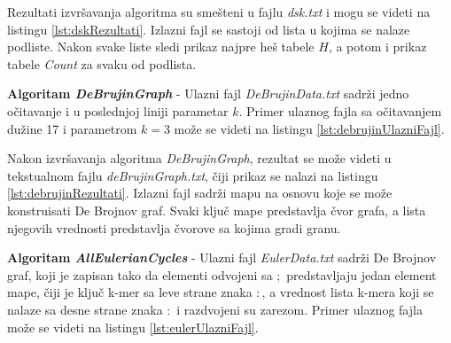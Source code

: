 \documentclass[12pt,oneside]{memoir}
\begin{document}


Rezultati izvršavanja algoritma su smešteni u fajlu \textit{dsk.txt} i mogu se videti na listingu \ref{lst:dskRezultati}. Izlazni fajl se sastoji od lista u kojima se nalaze podliste. Nakon svake liste sledi prikaz najpre heš tabele $H$, a potom i prikaz tabele \textit{Count} za svaku od podlista.




\textbf{Algoritam \textit{DeBrujinGraph}} - Ulazni fajl \textit{DeBrujinData.txt} sadrži jedno očitavanje i u poslednjoj liniji parametar $k$. Primer ulaznog fajla sa očitavanjem dužine 17 i parametrom $k = 3$ može se videti na listingu \ref{lst:debrujinUlazniFajl}.



Nakon izvršavanja algoritma \textit{DeBrujinGraph}, rezultat se može videti u tekstualnom fajlu \textit{deBrujinGraph.txt}, čiji prikaz se nalazi na listingu \ref{lst:debrujinRezultati}. Izlazni fajl sadrži mapu na osnovu koje se može konstruisati De Brojnov graf. Svaki ključ mape predstavlja čvor grafa, a lista njegovih vrednosti predstavlja čvorove sa kojima gradi granu.



\textbf{Algoritam \textit{AllEulerianCycles}} - Ulazni fajl \textit{EulerData.txt} sadrži De Brojnov graf, koji je zapisan tako da elementi odvojeni sa $;$ predstavljaju jedan element mape, čiji je ključ k-mer sa leve strane znaka $:$, a vrednost lista k-mera koji se nalaze sa desne strane znaka $:$ i razdvojeni su zarezom. Primer ulaznog fajla može se videti na listingu \ref{lst:eulerUlazniFajl}.
\end{document}
